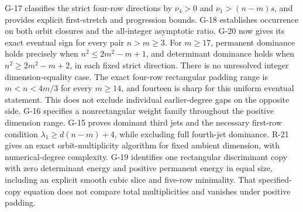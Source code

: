 G-17 classifies the strict four-row directions by $\nu_4>0$ and $\nu_1>(n-m)s$, and provides explicit first-stretch and progression bounds. G-18 establishes occurrence on both orbit closures and the all-integer asymptotic ratio. G-20 now gives its exact eventual sign for every pair $n>m\ge3$. For $m\ge17$, permanent dominance holds precisely when $n^2\le2m^2-m+1$, and determinant dominance holds when $n^2\ge2m^2-m+2$, in each fixed strict direction. There is no unresolved integer dimension-equality case. The exact four-row rectangular padding range is $m<n<4m/3$ for every $m\ge14$, and fourteen is sharp for this uniform eventual statement. This does not exclude individual earlier-degree gaps on the opposite side. G-16 specifies a nonrectangular weight family throughout the positive dimension range. G-15 proves dominant third jets and the necessary first-row condition $\lambda_1\ge d(n-m)+4$, while excluding full fourth-jet dominance. R-21 gives an exact orbit-multiplicity algorithm for fixed ambient dimension, with numerical-degree complexity. G-19 identifies one rectangular discriminant copy with zero determinant energy and positive permanent energy in equal size, including an explicit smooth cubic slice and five-row minimality. That specified-copy equation does not compare total multiplicities and vanishes under positive padding.

